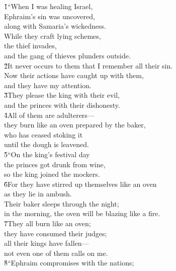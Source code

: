 
\begin{poetry}
\poeml {}
\v{1}``When I was healing Israel, \\
\poeml Ephraim's sin was uncovered, \\
\poemlll       along with Samaria's wickedness. \\
\poeml While they craft lying schemes, \\
\poemll    the thief invades, \\
\poemlll       and the gang of thieves plunders outside. \\
\poeml \v{2}It never occurs to them that I remember all their sin. \\
\poemll    Now their actions have caught up with them, \\
\poemlll       and they have my attention. \\
\poeml \v{3}They please the king with their evil, \\
\poemll    and the princes with their dishonesty. \\
\poeml \v{4}All of them are adulterers--- \\
\poemll    they burn like an oven prepared by the baker, \\
\poeml who has ceased stoking it \\
\poemll    until the dough is leavened. \\
\poeml \v{5}``On the king's festival day \\
\poemll    the princes got drunk from wine, \\
\poemlll       so the king joined the mockers. \\
\poeml \v{6}For they have stirred up themselves like an oven \\
\poemll    as they lie in ambush. \\
\poeml Their baker sleeps through the night; \\
\poemll    in the morning, the oven will be blazing like a fire. \\
\poeml \v{7}They all burn like an oven; \\
\poemll    they have consumed their judges; \\
\poeml all their kings have fallen--- \\
\poemll    not even one of them calls on me. \\
\poeml \v{8}``Ephraim compromises with the nations; \\

\end{poetry}
